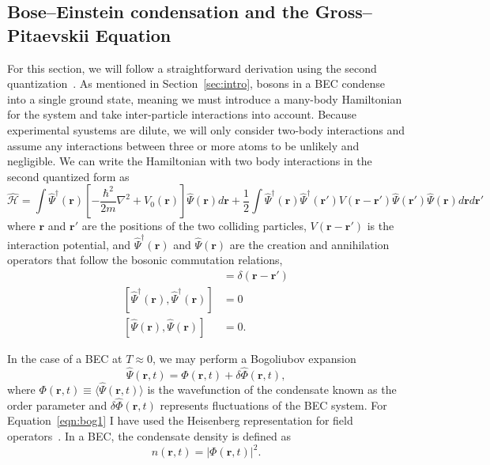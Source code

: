 \subsection{Bose--Einstein condensation and the Gross--Pitaevskii Equation}

For this section, we will follow a straightforward derivation using the second quantization~\cite{aversa2008}.
As mentioned in Section~\ref{sec:intro}, bosons in a BEC condense into a single ground state, meaning we must introduce a many-body Hamiltonian for the system and take inter-particle interactions into account.
Because experimental syustems are dilute, we will only consider two-body interactions and assume any interactions between three or more atoms to be unlikely and negligible.
We can write the Hamiltonian with two body interactions in the second quantized form as
\begin{equation}
    \mathcal{\hat H} = \int \hat \Psi^\dagger(\mathbf{r})\left[-\frac{\hbar^2}{2m}\nabla^2 + V_0(\mathbf{r}) \right]\hat \Psi(\mathbf{r}) d\mathbf{r} + \frac{1}{2} \int  \hat \Psi^\dagger(\mathbf{r}) \hat \Psi^\dagger(\mathbf{r'}) V(\mathbf{r} - \mathbf{r'})\hat \Psi(\mathbf{r'}) \hat \Psi(\mathbf{r}) d\mathbf{r} d\mathbf{r'}
    \label{eqn:2nd}
\end{equation}
where $\mathbf{r}$ and $\mathbf{r'}$ are the positions of the two colliding particles, $V(\mathbf{r}-\mathbf{r'})$ is the interaction potential, and $\hat \Psi^\dagger(\mathbf{r})$ and $\hat \Psi(\mathbf{r})$ are the creation and annihilation operators that follow the bosonic commutation relations,
\begin{align}
 [\hat \Psi(\mathbf{r}),\hat \Psi^\dagger(\mathbf{r})] &= \delta(\mathbf{r} - \mathbf{r'}) \\
 [\hat \Psi^\dagger(\mathbf{r}),\hat \Psi^\dagger(\mathbf{r})] &= 0 \\
 [\hat \Psi(\mathbf{r}),\hat \Psi(\mathbf{r})] &= 0.
\end{align}

\noindent In the case of a BEC at $T\approx0$, we may perform a Bogoliubov expansion~\cite{bogoliubov1947, dalfovo1999}
\begin{equation}
    \hat \Psi (\mathbf{r}, t) = \Phi(\mathbf{r},t) + \delta \hat \Phi(\mathbf{r},t),
\label{eqn:bog}
\end{equation}
where $\Phi(\mathbf{r},t) \equiv \langle \hat \Psi(\mathbf{r},t) \rangle$ is the wavefunction of the condensate known as the order parameter and $\delta \hat \Phi(\mathbf{r},t)$ represents fluctuations of the BEC system.
For Equation~\eqref{eqn:bog1} I have used the Heisenberg representation for field operators~\cite{dalfovo1999}.
In a BEC, the condensate density is defined as
\begin{equation}
    n(\mathbf{r},t) = |\Phi(\mathbf{r},t)|^2.
\end{equation}

